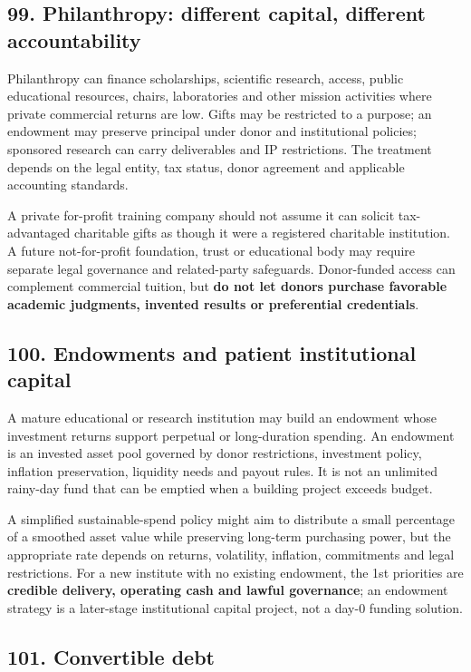 \subsection{99. Philanthropy: different capital, different accountability}


Philanthropy can finance scholarships, scientific research, access, public educational resources, chairs, laboratories and other mission activities where private commercial returns are low. Gifts may be restricted to a purpose; an endowment may preserve principal under donor and institutional policies; sponsored research can carry deliverables and IP restrictions. The treatment depends on the legal entity, tax status, donor agreement and applicable accounting standards.

A private for-profit training company should not assume it can solicit tax-advantaged charitable gifts as though it were a registered charitable institution. A future not-for-profit foundation, trust or educational body may require separate legal governance and related-party safeguards. Donor-funded access can complement commercial tuition, but \textbf{do not let donors purchase favorable academic judgments, invented results or preferential credentials}.

\subsection{100. Endowments and patient institutional capital}


A mature educational or research institution may build an endowment whose investment returns support perpetual or long-duration spending. An endowment is an invested asset pool governed by donor restrictions, investment policy, inflation preservation, liquidity needs and payout rules. It is not an unlimited rainy-day fund that can be emptied when a building project exceeds budget.

A simplified sustainable-spend policy might aim to distribute a small percentage of a smoothed asset value while preserving long-term purchasing power, but the appropriate rate depends on returns, volatility, inflation, commitments and legal restrictions. For a new institute with no existing endowment, the 1st priorities are \textbf{credible delivery, operating cash and lawful governance}; an endowment strategy is a later-stage institutional capital project, not a day-0 funding solution.

\subsection{101. Convertible debt}


